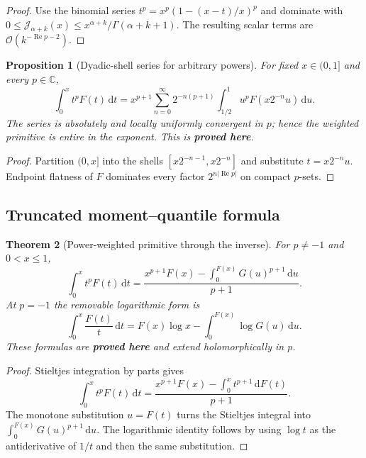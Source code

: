 \documentclass[11pt]{article}
\newcommand{\statusproved}{\textcolor{statusgreen}{\textbf{proved here}}}
\newtheorem{theorem}{Theorem}[section]
\newtheorem{proposition}[theorem]{Proposition}
\theoremstyle{definition}
\theoremstyle{remark}
\newcommand{\C}{\mathbb C}
\newcommand{\dd}{\,\mathrm d}
\newcommand{\Ree}{\operatorname{Re}}
\newcommand{\J}{\mathcal J}
\newcommand{\bigO}{\mathcal O}
\begin{document}
\begin{proof}
Use the binomial series
$t^p=x^p(1-(x-t)/x)^p$ and dominate with
$0\le\J_{\alpha+k}(x)\le x^{\alpha+k}/\Gamma(\alpha+k+1)$.  The resulting scalar terms are
$\bigO(k^{-\Ree p-2})$.
\end{proof}

\begin{proposition}[Dyadic-shell series for arbitrary powers]
\label{prop:dyadic-shell}
For fixed $x\in(0,1]$ and every $p\in\C$,
\begin{equation}
 \int_0^xt^pF(t)\dd t
 =x^{p+1}\sum_{n=0}^{\infty}2^{-n(p+1)}
 \int_{1/2}^{1}u^pF(x2^{-n}u)\dd u.
 \label{eq:dyadic-shell}
\end{equation}
The series is absolutely and locally uniformly convergent in $p$; hence the weighted
primitive is entire in the exponent.  This is \statusproved.
\end{proposition}

\begin{proof}
Partition $(0,x]$ into the shells
$[x2^{-n-1},x2^{-n}]$ and substitute $t=x2^{-n}u$.  Endpoint flatness of $F$ dominates every
factor $2^{n|\Ree p|}$ on compact $p$-sets.
\end{proof}

\subsection{Truncated moment--quantile formula}

\begin{theorem}[Power-weighted primitive through the inverse]
\label{thm:truncated-quantile}
For $p\ne-1$ and $0<x\le1$,
\begin{equation}
 \int_0^xt^pF(t)\dd t
 =\frac{x^{p+1}F(x)-\displaystyle\int_0^{F(x)}G(u)^{p+1}\dd u}{p+1}.
 \label{eq:truncated-quantile}
\end{equation}
At $p=-1$ the removable logarithmic form is
\begin{equation}
 \int_0^x\frac{F(t)}t\dd t
 =F(x)\log x-\int_0^{F(x)}\log G(u)\dd u.
 \label{eq:log-weight-F}
\end{equation}
These formulas are \statusproved{} and extend holomorphically in $p$.
\end{theorem}

\begin{proof}
Stieltjes integration by parts gives
\[
 \int_0^xt^pF(t)\dd t
 =\frac{x^{p+1}F(x)-\int_0^xt^{p+1}\dd F(t)}{p+1}.
\]
The monotone substitution $u=F(t)$ turns the Stieltjes integral into
$\int_0^{F(x)}G(u)^{p+1}\dd u$.  The logarithmic identity follows by using
$\log t$ as the antiderivative of $1/t$ and then the same substitution.
\end{proof}
\end{document}
